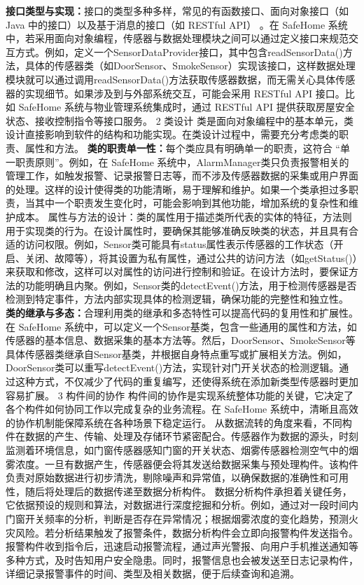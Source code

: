 \textbf{接口类型与实现：}接口的类型多种多样，常见的有函数接口、面向对象接口（如 Java 中的接口）以及基于消息的接口（如 RESTful API） 。在 SafeHome 系统中，若采用面向对象编程，传感器与数据处理模块之间可以通过定义接口来规范交互方式。例如，定义一个SensorDataProvider接口，其中包含readSensorData()方法，具体的传感器类（如DoorSensor、SmokeSensor）实现该接口，这样数据处理模块就可以通过调用readSensorData()方法获取传感器数据，而无需关心具体传感器的实现细节。如果涉及到与外部系统交互，可能会采用 RESTful API 接口。比如 SafeHome 系统与物业管理系统集成时，通过 RESTful API 提供获取房屋安全状态、接收控制指令等接口服务。 2 类设计 类是面向对象编程中的基本单元，类设计直接影响到软件的结构和功能实现。在类设计过程中，需要充分考虑类的职责、属性和方法。 \textbf{类的职责单一性：}每个类应具有明确单一的职责，这符合 ``单一职责原则''。例如，在 SafeHome 系统中，AlarmManager类只负责报警相关的管理工作，如触发报警、记录报警日志等，而不涉及传感器数据的采集或用户界面的处理。这样的设计使得类的功能清晰，易于理解和维护。如果一个类承担过多职责，当其中一个职责发生变化时，可能会影响到其他功能，增加系统的复杂性和维护成本。 属性与方法的设计：类的属性用于描述类所代表的实体的特征，方法则用于实现类的行为。在设计属性时，要确保其能够准确反映类的状态，并且具有合适的访问权限。例如，Sensor类可能具有status属性表示传感器的工作状态（开启、关闭、故障等），将其设置为私有属性，通过公共的访问方法（如getStatus()）来获取和修改，这样可以对属性的访问进行控制和验证。在设计方法时，要保证方法的功能明确且内聚。例如，Sensor类的detectEvent()方法，用于检测传感器是否检测到特定事件，方法内部实现具体的检测逻辑，确保功能的完整性和独立性。 \textbf{类的继承与多态：}合理利用类的继承和多态特性可以提高代码的复用性和扩展性。在 SafeHome 系统中，可以定义一个Sensor基类，包含一些通用的属性和方法，如传感器的基本信息、数据采集的基本方法等。然后，DoorSensor、SmokeSensor等具体传感器类继承自Sensor基类，并根据自身特点重写或扩展相关方法。例如，DoorSensor类可以重写detectEvent()方法，实现针对门开关状态的检测逻辑。通过这种方式，不仅减少了代码的重复编写，还使得系统在添加新类型传感器时更加容易扩展。 3 构件间的协作 构件间的协作是实现系统整体功能的关键，它决定了各个构件如何协同工作以完成复杂的业务流程。在 SafeHome 系统中，清晰且高效的协作机制能保障系统在各种场景下稳定运行。 从数据流转的角度来看，不同构件在数据的产生、传输、处理及存储环节紧密配合。传感器作为数据的源头，时刻监测着环境信息，如门窗传感器感知门窗的开关状态、烟雾传感器检测空气中的烟雾浓度。一旦有数据产生，传感器便会将其发送给数据采集与预处理构件。该构件负责对原始数据进行初步清洗，剔除噪声和异常值，以确保数据的准确性和可用性，随后将处理后的数据传递至数据分析构件。 数据分析构件承担着关键任务，它依据预设的规则和算法，对数据进行深度挖掘和分析。例如，通过对一段时间内门窗开关频率的分析，判断是否存在异常情况；根据烟雾浓度的变化趋势，预测火灾风险。若分析结果触发了报警条件，数据分析构件会立即向报警构件发送指令。报警构件收到指令后，迅速启动报警流程，通过声光警报、向用户手机推送通知等多种方式，及时告知用户安全隐患。同时，报警信息也会被发送至日志记录构件，详细记录报警事件的时间、类型及相关数据，便于后续查询和追溯。 